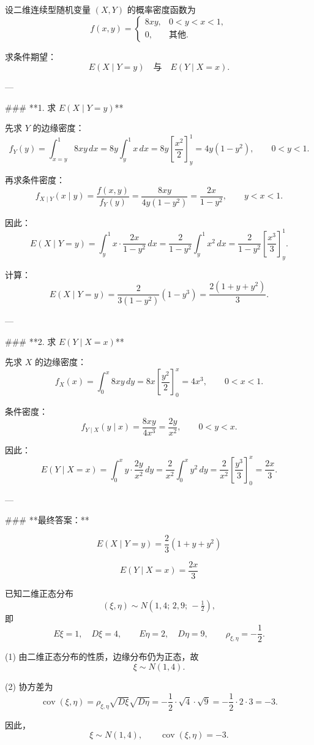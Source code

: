 \begin{homework}[ 3.39]
设二维连续型随机变量 $(X,Y)$ 的概率密度函数为
\[
f(x,y) =
\begin{cases}
    8xy, & 0 < y < x < 1, \\
    0,   & \text{其他}.
\end{cases}
\]

求条件期望：
\[
E(X \mid Y = y) \quad \text{与} \quad E(Y \mid X = x).
\]
\end{homework}

\begin{solution}

---

### **1. 求 $E(X\mid Y=y)$**

先求 $Y$ 的边缘密度：
\[
f_Y(y)=\int_{x=y}^{1} 8xy\,dx
     = 8y\int_y^{1}x\,dx
     = 8y\left[\frac{x^2}{2}\right]_{y}^{1}
     =4y(1-y^2),\qquad 0<y<1.
\]

再求条件密度：
\[
f_{X\mid Y}(x\mid y)
=\frac{f(x,y)}{f_Y(y)}
=\frac{8xy}{4y(1-y^2)}
=\frac{2x}{1-y^2},\qquad y<x<1.
\]

因此：
\[
E(X\mid Y=y)
=\int_y^{1} x\cdot \frac{2x}{1-y^2}\,dx
=\frac{2}{1-y^2}\int_y^{1} x^2\,dx
=\frac{2}{1-y^2}\left[\frac{x^3}{3}\right]_{y}^{1}.
\]

计算：
\[
E(X\mid Y=y)
=\frac{2}{3(1-y^2)}(1-y^3)
=\frac{2(1+y+y^2)}{3}.
\]

---

### **2. 求 $E(Y\mid X=x)$**

先求 $X$ 的边缘密度：
\[
f_X(x)=\int_{0}^{x} 8xy\,dy
      =8x\left[\frac{y^2}{2}\right]_{0}^{x}
      =4x^3,\qquad 0<x<1.
\]

条件密度：
\[
f_{Y\mid X}(y\mid x)
=\frac{8xy}{4x^3}
=\frac{2y}{x^2},\qquad 0<y<x.
\]

因此：
\[
E(Y\mid X=x)
=\int_0^{x} y\cdot\frac{2y}{x^2}\,dy
=\frac{2}{x^2}\int_0^{x} y^2\,dy
=\frac{2}{x^2}\left[\frac{y^3}{3}\right]_{0}^{x}
=\frac{2x}{3}.
\]

---

### **最终答案：**

\[
\boxed{E(X\mid Y=y)=\frac{2}{3}(1+y+y^2)}
\]

\[
\boxed{E(Y\mid X=x)=\frac{2x}{3}}
\]

\end{solution}
\begin{solution}
已知二维正态分布
\[
(\xi,\eta)\sim N(1,4;\,2,9;\,-\tfrac12),
\]
即
\[
E\xi=1,\quad D\xi=4,\qquad E\eta=2,\quad D\eta=9,\qquad \rho_{\xi,\eta}=-\frac12.
\]

(1) 由二维正态分布的性质，边缘分布仍为正态，故
\[
\xi\sim N(1,4).
\]

(2) 协方差为
\[
\operatorname{cov}(\xi,\eta)
=\rho_{\xi,\eta}\sqrt{D\xi}\sqrt{D\eta}
=-\frac12\cdot\sqrt{4}\cdot\sqrt{9}
=-\frac12\cdot 2\cdot 3=-3.
\]

因此，
\[
\xi\sim N(1,4),\qquad \operatorname{cov}(\xi,\eta)=-3.
\]
\end{solution}
